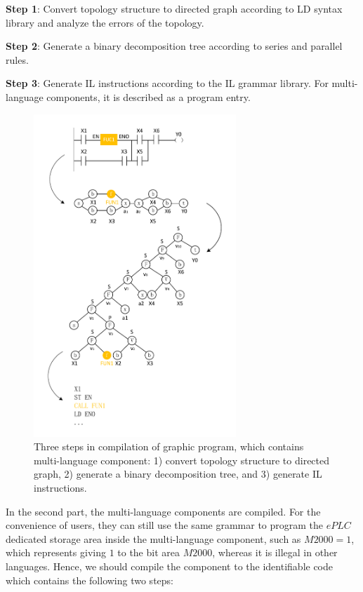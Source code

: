 \documentclass[journal,UTF8]{IEEEtran}
\begin{document}
 \textbf{Step 1}: Convert topology structure to directed graph according to LD syntax library and analyze the errors of the topology.
 	
 \textbf{Step 2}: Generate a binary decomposition tree according to series and parallel rules.
 	
 \textbf{Step 3}: Generate IL instructions according to the IL grammar library. For multi-language components, it is described as a program entry.
 
 \begin{figure}
 	\centering
 	\includegraphics[width=3in]{fig/Compile.pdf}
 	\caption{Three steps in compilation of graphic program, which contains multi-language component: 1) convert topology structure to directed graph, 2) generate a binary decomposition tree, and 3) generate IL instructions.}
 	\label{fig:Compile}
 \end{figure}
 
In the second part, the multi-language components are compiled. For the convenience of users, they can still use the same grammar to program the $ePLC$ dedicated storage area inside the multi-language component, such as $M2000=1$, which represents giving $1$ to the bit area $M2000$, whereas it is illegal in other languages. Hence, we should compile the component to the identifiable code which contains the following two steps:
 	
\end{document}
